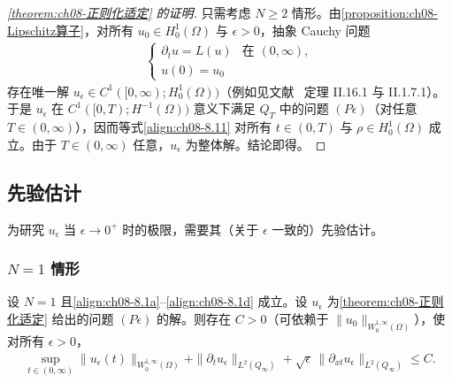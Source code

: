 \documentclass[../../main.tex]{subfiles}%
\begin{document}
\begin{proof}[\cref{theorem:ch08-正则化适定} 的证明]
只需考虑 $N\geqslant2$ 情形。由\cref{proposition:ch08-Lipschitz算子}，对所有 $u_0\in H^1_0(\Omega)$ 与 $\epsilon>0$，抽象 Cauchy 问题
\begin{align}
\begin{cases}
\partial_t u=L(u) & \text{在 }(0,\infty),\\
u(0)=u_0
\end{cases} \label{align:ch08-8.20}
\end{align}
存在唯一解 $u_\epsilon\in C^1([0,\infty);H^1_0(\Omega))$（例如见文献~\cite{ref31} 定理 II.16.1 与 II.1.7.1）。于是 $u_\epsilon$ 在 $C^1([0,T);H^{-1}(\Omega))$ 意义下满足 $Q_T$ 中的问题 $(P\epsilon)$（对任意 $T\in(0,\infty)$），因而等式\eqref{align:ch08-8.11} 对所有 $t\in(0,T)$ 与 $\rho\in H^1_0(\Omega)$ 成立。由于 $T\in(0,\infty)$ 任意，$u_\epsilon$ 为整体解。结论即得。
\end{proof}

\subsection{先验估计}\label{subsection:ch08-先验估计}

为研究 $u_\epsilon$ 当 $\epsilon\to0^+$ 时的极限，需要其（关于 $\epsilon$ 一致的）先验估计。

\subsubsection{$N=1$ 情形}\label{subsubsection:ch08-N1估计}

\begin{proposition}[$N=1$ 先验估计]\label{proposition:ch08-先验估计N1}
设 $N=1$ 且\eqref{align:ch08-8.1a}--\eqref{align:ch08-8.1d} 成立。设 $u_\epsilon$ 为\cref{theorem:ch08-正则化适定} 给出的问题 $(P\epsilon)$ 的解。则存在 $C>0$（可依赖于 $\|u_0\|_{W^{1,\infty}_0(\Omega)}$），使对所有 $\epsilon>0$，
\begin{align}
\sup_{t\in(0,\infty)}\|u_\epsilon(t)\|_{W^{1,\infty}_0(\Omega)}
+\|\partial_t u_\epsilon\|_{L^2(Q_\infty)}
+\sqrt{\epsilon}\,\|\partial_{xt}u_\epsilon\|_{L^2(Q_\infty)}\leqslant C. \label{align:ch08-8.21}
\end{align}
\end{proposition}
\end{document}
